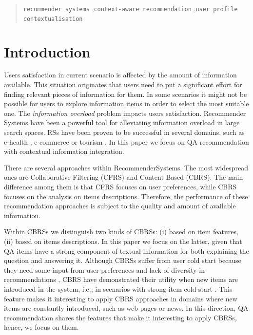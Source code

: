 \documentclass[preprint]{elsarticle}
\begin{document}
\begin{spacing}{1.5}
\begin{frontmatter}
\begin{abstract}
\begin{keyword}
   \texttt{recommender systems} \sep \texttt{context-aware recommendation} \sep \texttt{user profile contextualisation}
\end{keyword}
\end{abstract}

\end{frontmatter}

\section{Introduction}\label{sec:introduction}

Users satisfaction in current scenario is affected by the amount of information available. This situation originates that users need to put a significant effort for finding relevant pieces of information for them. In some scenarios it might not be possible for users to explore information items in order to select the most suitable one. The \emph{information overload} problem impacts users satisfaction. Recommender Systems have been a powerful tool for alleviating information overload in large search spaces. RSs have been proven to be successful in several domains, such as e-health \cite{}, e-commerce \cite{} or tourism \cite{}. In this paper we focus on QA recommendation with contextual information integration.

There are several approaches within RecommenderSystems. The most widespread ones are Collaborative Filtering (CFRS) and Content Based (CBRS). The main difference among them is that CFRS focuses on user preferences, while CBRS focuses on the analysis on items descriptions. Therefore, the performance of these recommendation approaches is subject to the quality and amount of available information.

Within CBRSs we distinguish two kinds of CBRSs: (i) based on item features, (ii) based on items descriptions. In this paper we focus on the latter, given that QA items have a strong component of textual information for both explaining the question and answering it. Although CBRSs suffer from user cold start because they need some input from user preferences and lack of diversity in recommendations \cite{}, CBRS have demonstrated their utility when new items are introduced in the system, i.e., in scenarios with strong item cold-start \cite{Aggarwal2016}. This feature makes it interesting to apply CBRS approaches in domains where new items are constantly introduced, such as web pages or news. In this direction, QA recommendation shares the features that make it interesting to apply CBRSs, hence, we focus on them.


\end{spacing}
\end{document}
